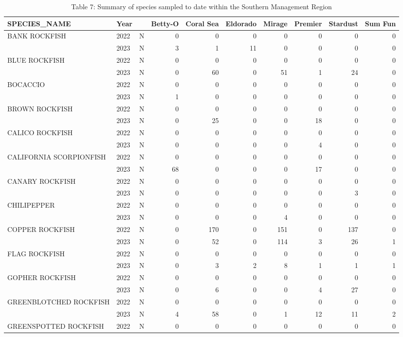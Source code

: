 \documentclass[
  letterpaper,
  DIV=11,
  numbers=noendperiod]{scrartcl}
\begin{document}
\begin{table}

\caption{Table 7: Summary of species sampled to date within the Southern Management Region}
\centering
\begin{tabular}[t]{lllrrrrrrr}
\toprule
SPECIES\_NAME & Year &   & Betty-O & Coral Sea & Eldorado & Mirage & Premier & Stardust & Sum Fun\\
\midrule
BANK ROCKFISH & 2022 & N & 0 & 0 & 0 & 0 & 0 & 0 & 0\\
 & 2023 & N & 3 & 1 & 11 & 0 & 0 & 0 & 0\\
BLUE ROCKFISH & 2022 & N & 0 & 0 & 0 & 0 & 0 & 0 & 0\\
 & 2023 & N & 0 & 60 & 0 & 51 & 1 & 24 & 0\\
BOCACCIO & 2022 & N & 0 & 0 & 0 & 0 & 0 & 0 & 0\\
 & 2023 & N & 1 & 0 & 0 & 0 & 0 & 0 & 0\\
BROWN ROCKFISH & 2022 & N & 0 & 0 & 0 & 0 & 0 & 0 & 0\\
 & 2023 & N & 0 & 25 & 0 & 0 & 18 & 0 & 0\\
CALICO ROCKFISH & 2022 & N & 0 & 0 & 0 & 0 & 0 & 0 & 0\\
 & 2023 & N & 0 & 0 & 0 & 0 & 4 & 0 & 0\\
CALIFORNIA SCORPIONFISH & 2022 & N & 0 & 0 & 0 & 0 & 0 & 0 & 0\\
 & 2023 & N & 68 & 0 & 0 & 0 & 17 & 0 & 0\\
CANARY ROCKFISH & 2022 & N & 0 & 0 & 0 & 0 & 0 & 0 & 0\\
 & 2023 & N & 0 & 0 & 0 & 0 & 0 & 3 & 0\\
CHILIPEPPER & 2022 & N & 0 & 0 & 0 & 0 & 0 & 0 & 0\\
 & 2023 & N & 0 & 0 & 0 & 4 & 0 & 0 & 0\\
COPPER ROCKFISH & 2022 & N & 0 & 170 & 0 & 151 & 0 & 137 & 0\\
 & 2023 & N & 0 & 52 & 0 & 114 & 3 & 26 & 1\\
FLAG ROCKFISH & 2022 & N & 0 & 0 & 0 & 0 & 0 & 0 & 0\\
 & 2023 & N & 0 & 3 & 2 & 8 & 1 & 1 & 1\\
GOPHER ROCKFISH & 2022 & N & 0 & 0 & 0 & 0 & 0 & 0 & 0\\
 & 2023 & N & 0 & 6 & 0 & 0 & 4 & 27 & 0\\
GREENBLOTCHED ROCKFISH & 2022 & N & 0 & 0 & 0 & 0 & 0 & 0 & 0\\
 & 2023 & N & 4 & 58 & 0 & 1 & 12 & 11 & 2\\
GREENSPOTTED ROCKFISH & 2022 & N & 0 & 0 & 0 & 0 & 0 & 0 & 0\\

\end{tabular}
\end{table}
\end{document}
